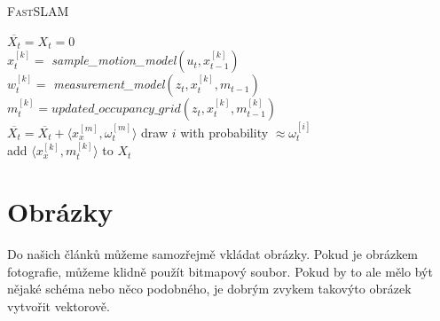 \documentclass[11pt, a4paper]{article}
\begin{document}
\begin{algorithm}[H]
\caption{\textsc{FastSLAM}}
\label{alg1}
\SetNlSkip{-4.5mm}
\SetInd{1em}{1em}
\SetNlSty{}{}{:}
\BlankLine
        \Indp \Indp
        $\overline{X_t} = X_t = 0$\\
        { 
            $x_t^{[k]} =$ \emph{sample\_motion\_model}$(u_t,x_{t-1}^{[k]})$\\
            $w_t^{[k]} =$ \emph{measurement\_model}$(z_t,x_t^{[k]},m_{t-1})$\\
            $m_t^{[k]} = updated\_occupancy\_grid(z_t,x_t^{[k]},m_{t-1}^{[k]})$\\
            $\overline{X_t} = \overline{X_t} + \langle x_x^{[m]},\omega_t^{[m]}\rangle$
        }
        {
            draw $i$ with probability $\approx \omega_t^{[i]}$\\
            add $\langle x_x^{[k]},m_t^{[k]}\rangle$ to $X_t$\\
        }
\end{algorithm}

\vspace{3mm}

\section{Obrázky}

Do našich článků můžeme samozřejmě vkládat obrázky. Pokud je obrázkem fotografie,
můžeme klidně použít bitmapový soubor. Pokud by to ale mělo být nějaké schéma nebo
něco podobného, je dobrým zvykem takovýto obrázek vytvořit vektorově.
\end{document}
